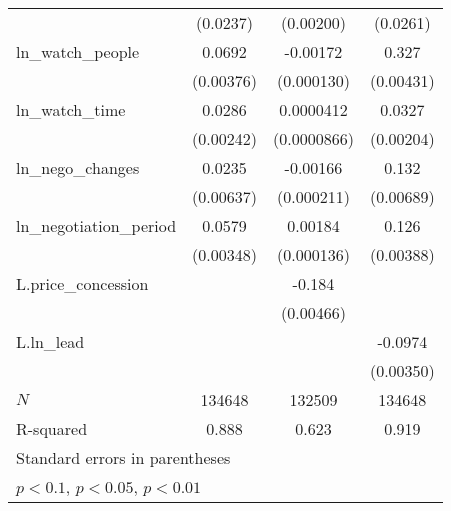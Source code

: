 {\begin{tabular}{l*{3}{c}}
            &    (0.0237)         &   (0.00200)         &    (0.0261)         \\
\addlinespace
ln\_watch\_people&      0.0692\sym{***}&    -0.00172\sym{***}&       0.327\sym{***}\\
            &   (0.00376)         &  (0.000130)         &   (0.00431)         \\
\addlinespace
ln\_watch\_time&      0.0286\sym{***}&   0.0000412         &      0.0327\sym{***}\\
            &   (0.00242)         & (0.0000866)         &   (0.00204)         \\
\addlinespace
ln\_nego\_changes&      0.0235\sym{***}&    -0.00166\sym{***}&       0.132\sym{***}\\
            &   (0.00637)         &  (0.000211)         &   (0.00689)         \\
\addlinespace
ln\_negotiation\_period&      0.0579\sym{***}&     0.00184\sym{***}&       0.126\sym{***}\\
            &   (0.00348)         &  (0.000136)         &   (0.00388)         \\
\addlinespace
L.price\_concession&                     &      -0.184\sym{***}&                     \\
            &                     &   (0.00466)         &                     \\
\addlinespace
L.ln\_lead   &                     &                     &     -0.0974\sym{***}\\
            &                     &                     &   (0.00350)         \\
\midrule
\(N\)       &      134648         &      132509         &      134648         \\
R-squared   &       0.888         &       0.623         &       0.919         \\
\bottomrule
\multicolumn{4}{l}{\footnotesize Standard errors in parentheses}\\
\multicolumn{4}{l}{\footnotesize \sym{*} \(p<0.1\), \sym{**} \(p<0.05\), \sym{***} \(p<0.01\)}\\
\end{tabular}
}

